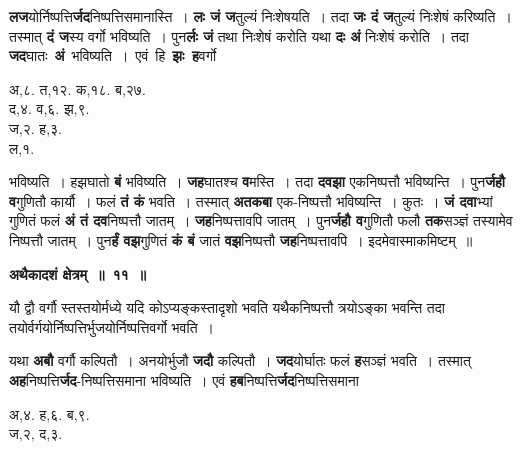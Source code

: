 \documentclass[11pt, openany]{book}
\begin{document}
\begin{flushleft}
\begin{minipage}[t]{0.6\textwidth}
\hspace{4mm} \textbf{लज}योर्निष्पत्ति\textbf{र्जद}निष्पत्तिसमानास्ति~। \textbf{लः जं ज}तुल्यं निःशेषयति~। तदा \textbf{जः दं ज}तुल्यं निःशेषं करिष्यति~। तस्मात् \textbf{दं ज}स्य वर्गो भविष्यति~। पुन\textbf{र्लः जं} तथा निःशेषं करोति यथा \textbf{दः अं} निःशेषं करोति~। तदा \,\textbf{जद}घातः \,\textbf{अं} \,भविष्यति~। \,एवं \,हि \,\textbf{झः \,ह}वर्गो
\end{minipage} 
\hfill
\begin{minipage}[t]{0.3\textwidth}
\begin{center}
अ,८. त,१२. क,१८. ब,२७.\\
द,४. व,६. झ,९.\\
ज,२. ह,३.\\
ल,१.
\end{center}
\end{minipage}
\end{flushleft}
\vspace{-3mm}

\noindent भविष्यति~। हझघातो \textbf{बं} भविष्यति~। \textbf{जह}घातश्च \textbf{व}मस्ति~। तदा \textbf{दवझा} एकनिष्पत्तौ भविष्यन्ति~। पुन\textbf{र्जहौ व}गुणितौ कार्यौ~। फलं \textbf{तं कं} भवति~। तस्मात् \textbf{अतकबा} एक-निष्पत्तौ भविष्यन्ति~।  कुतः~। \textbf{जं दवा}भ्यां गुणितं फलं \textbf{अं तं दव}निष्पत्तौ जातम्~। \textbf{जह}निष्पत्तावपि जातम्~। पुन\textbf{र्जहौ व}गुणितौ फलौ \textbf{तक}सञ्ज्ञं तस्यामेव निष्पत्तौ जातम्~। पुन\textbf{र्हं वझ}गुणितं \textbf{कं बं} जातं \textbf{वझ}निष्पत्तौ \textbf{जह}निष्पत्तावपि~। इदमेवास्माकमिष्टम्~॥ 
\vspace{2mm}

\begin{center}
\textbf{\large अथैकादशं क्षेत्रम्~॥~११~॥}
\end{center}

 {\ab यौ द्वौ वर्गौ स्तस्तयोर्मध्ये यदि कोऽप्यङ्कस्तादृशो भवति यथैकनिष्पत्तौ त्रयोऽङ्का भवन्ति तदा तयोर्वर्गयोर्निष्पत्तिर्भुजयोर्निष्पत्तिवर्गो भवति~।} 

\begin{flushleft}
\begin{minipage}[t]{0.7\textwidth}
\hspace{4mm} यथा \textbf{अबौ} वर्गौ कल्पितौ~। अनयोर्भुजौ \textbf{जदौ} कल्पितौ~। \textbf{जद}योर्घातः फलं \textbf{ह}सञ्ज्ञं भवति~। तस्मात् \textbf{अह}निष्पत्ति\textbf{र्जद}-निष्पत्तिसमाना भविष्यति~। एवं \textbf{हब}निष्पत्ति\textbf{र्जद}निष्पत्तिसमाना 
\end{minipage} 
\hfill
\begin{minipage}[t]{0.2\textwidth}
अ,४. ह,६. ब,९.\\
ज,२, द,३.
\end{minipage}
\end{flushleft}
\vspace{-3mm}
\end{document}
